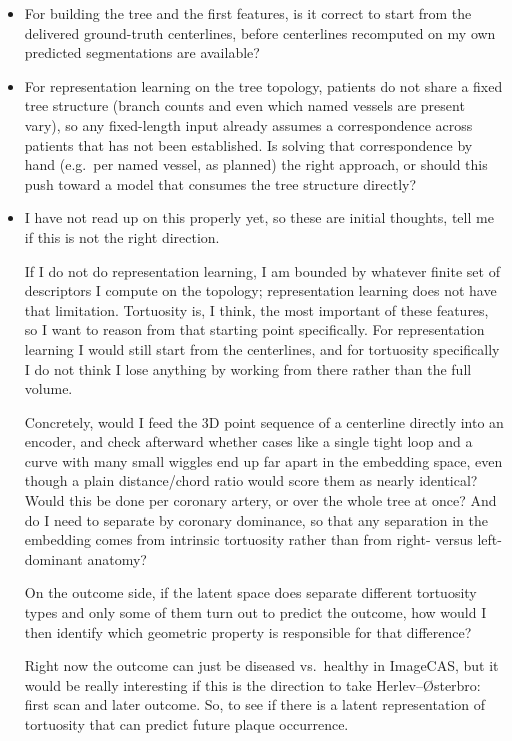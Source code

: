 \documentclass[11pt,a4paper]{article}
\begin{document}
\begin{itemize}
    \item For building the tree and the first features, is it correct to start from the delivered
    ground-truth centerlines, before centerlines recomputed on my own predicted segmentations are
    available?
    \item For representation learning on the tree topology, patients do not share a fixed tree
    structure (branch counts and even which named vessels are present vary), so any fixed-length
    input already assumes a correspondence across patients that has not been established. Is
    solving that correspondence by hand (e.g.\ per named vessel, as planned) the right approach, or
    should this push toward a model that consumes the tree structure directly?
    \item I have not read up on this properly yet, so these are initial thoughts, tell me if this is
    not the right direction.

    If I do not do representation learning, I am bounded by whatever finite set of descriptors I
    compute on the topology; representation learning does not have that limitation. Tortuosity is, I
    think, the most important of these features, so I want to reason from that starting point
    specifically. For representation learning I would still start from the centerlines, and for
    tortuosity specifically I do not think I lose anything by working from there rather than the
    full volume.

    Concretely, would I feed the 3D point sequence of a centerline directly into an encoder, and
    check afterward whether cases like a single tight loop and a curve with many small wiggles end
    up far apart in the embedding space, even though a plain distance/chord ratio would score them
    as nearly identical? Would this be done per coronary artery, or over the whole tree at once? And
    do I need to separate by coronary dominance, so that any separation in the embedding comes from
    intrinsic tortuosity rather than from right- versus left-dominant anatomy?

    On the outcome side, if the latent space does separate different tortuosity types and only some
    of them turn out to predict the outcome, how would I then identify which geometric property is
    responsible for that difference?

    Right now the outcome can just be diseased vs.\ healthy in ImageCAS, but it would be really
    interesting if this is the direction to take Herlev--{\O}sterbro: first scan and later outcome.
    So, to see if there is a latent representation of tortuosity that can predict future plaque
    occurrence.
\end{itemize}







\end{document}
